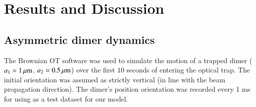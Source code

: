 \documentclass[final,  3p]{elsarticle}
\begin{document}
\section{Results and  Discussion}
\label{sec:Discussion}
\subsection{Asymmetric dimer dynamics}
\label{sec:motion}

The Brownian OT software was used to simulate the motion of a trapped dimer ($a_1=1\,{\rm \mu m}$, $a_2=0.5\,{\rm \mu m}$) over the first $10$ seconds of entering the optical trap.  The initial orientation was assumed as strictly vertical (in line with the beam propagation direction). The dimer's position orientation was recorded every 1 ms for using as a test dataset for our model.
\end{document}
